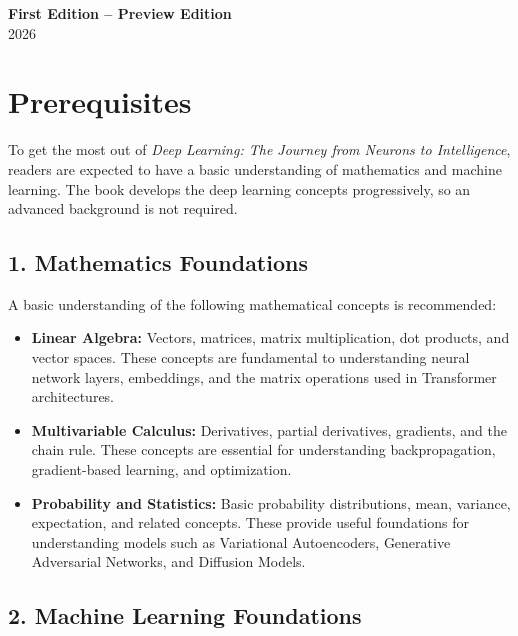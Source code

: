 \documentclass[11pt,a4paper,oneside]{book}
\begin{document}
\vspace{0.8cm}

\begin{center}
    \textbf{First Edition -- Preview Edition}\\[0.3cm]
    2026\\[0.8cm]
\end{center}

\vspace*{\fill}

\clearpage

\section*{Prerequisites}

To get the most out of \textit{Deep Learning: The Journey from Neurons to Intelligence}, readers are expected to have a basic understanding of mathematics and machine learning. The book develops the deep learning concepts progressively, so an advanced background is not required.

\subsection*{1. Mathematics Foundations}

A basic understanding of the following mathematical concepts is recommended:

\begin{itemize}
    \item \textbf{Linear Algebra:} Vectors, matrices, matrix multiplication, dot products, and vector spaces. These concepts are fundamental to understanding neural network layers, embeddings, and the matrix operations used in Transformer architectures.

    \item \textbf{Multivariable Calculus:} Derivatives, partial derivatives, gradients, and the chain rule. These concepts are essential for understanding backpropagation, gradient-based learning, and optimization.

    \item \textbf{Probability and Statistics:} Basic probability distributions, mean, variance, expectation, and related concepts. These provide useful foundations for understanding models such as Variational Autoencoders, Generative Adversarial Networks, and Diffusion Models.
\end{itemize}

\subsection*{2. Machine Learning Foundations}
\end{document}
